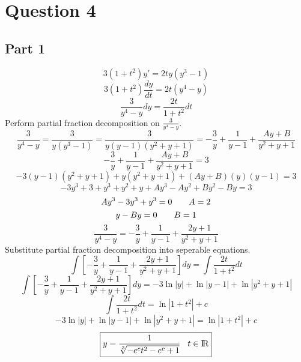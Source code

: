 \documentclass{article}
\begin{document}
\section*{Question 4}
\subsection*{Part 1}
\begin{center}
\[3(1+t^2)y'=2ty(y^3-1)\]
\[3(1+t^2)\frac{dy}{dt}=2t(y^4-y)\]
\[\frac{3}{y^4-y}dy=\frac{2t}{1+t^2}dt\]
Perform partial fraction decomposition on \(\frac{3}{y^4-y}\).
\[\frac{3}{y^4-y}=\frac{3}{y(y^3-1)}=\frac{3}{y(y-1)(y^2+y+1)}=-\frac{3}{y}+\frac{1}{y-1}+\frac{Ay+B}{y^2+y+1}\]
\[-\frac{3}{y}+\frac{1}{y-1}+\frac{Ay+B}{y^2+y+1}=3\]
\[-3(y-1)(y^2+y+1)+y(y^2+y+1)+(Ay+B)(y)(y-1)=3\]
\[-3y^3+3+y^3+y^2+y+Ay^3-Ay^2+By^2-By=3\]
\[Ay^3-3y^3+y^3=0\hspace{7 mm}A=2\]
\[y-By=0\hspace{7 mm}B=1\]
\[\frac{3}{y^4-y}=-\frac{3}{y}+\frac{1}{y-1}+\frac{2y+1}{y^2+y+1}\]
Substitute partial fraction decomposition into seperable equations.
\[\int\left[-\frac{3}{y}+\frac{1}{y-1}+\frac{2y+1}{y^2+y+1}\right]dy=\int\frac{2t}{1+t^2}dt\]
\[\int\left[-\frac{3}{y}+\frac{1}{y-1}+\frac{2y+1}{y^2+y+1}\right]dy=-3\ln|y|+\ln|y-1|+\ln|y^2+y+1|\]
\[\int\frac{2t}{1+t^2}dt=\ln|1+t^2|+c\]
\[-3\ln|y|+\ln|y-1|+\ln|y^2+y+1|=\ln|1+t^2|+c\]
\[\boxed{y=\frac{1}{\sqrt[3]{-e^ct^2-e^c+1}}\hspace{3 mm}t\in{\rm I\!R}}\]
\end{center}
\newpage
\end{document}
